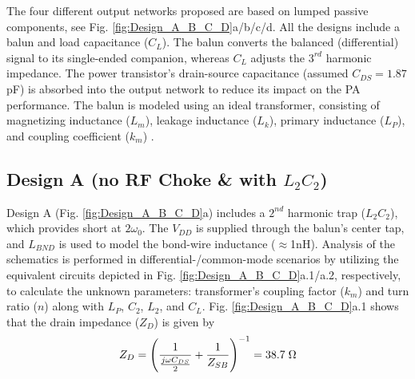 \documentclass[conference]{IEEEtran}
\begin{document}
The four different  output networks proposed are based on lumped passive components, see Fig. \ref{fig:Design_A_B_C_D}a/b/c/d. All the designs include a balun and load capacitance ($C_L$). The balun converts the balanced (differential) signal to its single-ended companion, whereas $C_L$ adjusts the $3^{rd}$ harmonic impedance. The power transistor's drain-source capacitance (assumed $C_{DS}=1.87$pF) is absorbed into the output network to reduce its impact on the PA performance. The balun is modeled using an ideal transformer, consisting of magnetizing inductance ($L_m$), leakage inductance ($L_k$), primary inductance ($L_P$), and coupling coefficient ($k_m$) \cite{Transformer_model}. 

\subsection{Design A (no RF Choke \& with $L_2C_2$)}
Design A (Fig. \ref{fig:Design_A_B_C_D}a) includes a $2^{nd}$ harmonic trap ($L_2C_2$), which provides short at $2\omega_0$. The $V_{DD}$ is supplied through the balun's center tap, and $L_{BND}$ is used to model the bond-wire inductance ($\approx$1nH). Analysis of the schematics is performed in differential-/common-mode scenarios by utilizing the equivalent circuits depicted in Fig. \ref{fig:Design_A_B_C_D}a.1/a.2, respectively, to calculate the unknown parameters: transformer's coupling factor ($k_m$) and turn ratio ($n$) along with  $L_P$, $C_2$, $L_2$, and $C_L$. Fig. \ref{fig:Design_A_B_C_D}a.1 shows that the drain impedance ($Z_D$) is given by
\vspace{-0.05in}
\begin{equation}
	Z_D=\left(\frac{1}{\frac{j\omega C_{DS}}{2}}+\frac{1}{Z_{SB}}\right)^{-1}=38.7 \hspace{1mm} \Omega
	\label{eqn:ZD}
\end{equation}
\end{document}
